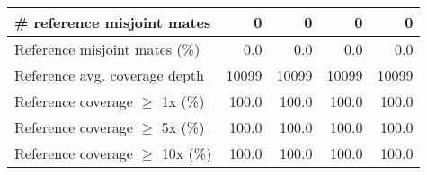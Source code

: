 \documentclass[12pt,a4paper]{article}
\begin{document}
\begin{table}[ht]
\begin{center}
\begin{tabular}{|l*{4}{|r}|}
\# reference misjoint mates & 0 & 0 & 0 & 0 \\ \hline
Reference misjoint mates (\%) & 0.0 & 0.0 & 0.0 & 0.0 \\ \hline
Reference avg. coverage depth & 10099 & 10099 & 10099 & 10099 \\ \hline
Reference coverage $\geq$ 1x (\%) & 100.0 & 100.0 & 100.0 & 100.0 \\ \hline
Reference coverage $\geq$ 5x (\%) & 100.0 & 100.0 & 100.0 & 100.0 \\ \hline
Reference coverage $\geq$ 10x (\%) & 100.0 & 100.0 & 100.0 & 100.0 \\ \hline
\end{tabular}
\end{center}
\end{table}
\end{document}
